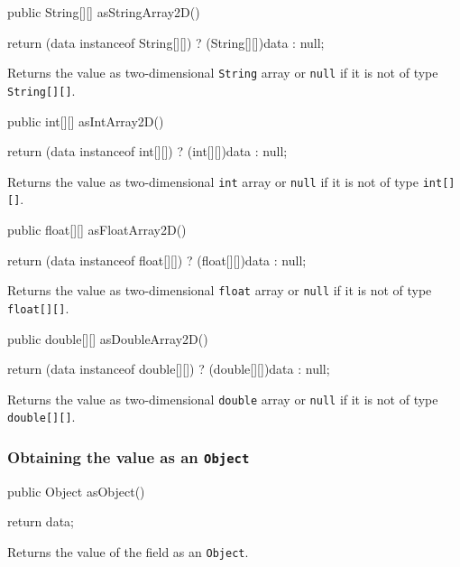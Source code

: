 \begin{code}
   
   public String[][] asStringArray2D() \begin{hide} {
      return (data instanceof String[][]) ? (String[][])data : null;
   }
   \end{hide}
\end{code}
\begin{tabb}
Returns the value as two-dimensional \texttt{String} array or \texttt{null} if it is not of type \texttt{String[][]}.
\end{tabb}
\begin{code}

   public int[][] asIntArray2D() \begin{hide} {
      return (data instanceof int[][]) ? (int[][])data : null;
   }
   \end{hide}
\end{code}
\begin{tabb}
Returns the value as two-dimensional \texttt{int} array or \texttt{null} if it is not of type \texttt{int[][]}.
\end{tabb}
\begin{code}
   
   public float[][] asFloatArray2D() \begin{hide} {
      return (data instanceof float[][]) ? (float[][])data : null;
   }
   \end{hide}
\end{code}
\begin{tabb}
Returns the value as two-dimensional \texttt{float} array or \texttt{null} if it is not of type \texttt{float[][]}.
\end{tabb}
\begin{code}

   public double[][] asDoubleArray2D() \begin{hide} {
      return (data instanceof double[][]) ? (double[][])data : null;
   }
   \end{hide}
\end{code}
\begin{tabb}
Returns the value as two-dimensional \texttt{double} array or \texttt{null} if it is not of type \texttt{double[][]}.
\end{tabb}

\subsubsection*{Obtaining the value as an \texttt{Object}}

\begin{code}
   public Object asObject() \begin{hide} {
      return data;
   }
   \end{hide}
\end{code}
\begin{tabb}
Returns the value of the field as an \texttt{Object}.
\end{tabb}
   
\begin{code}\begin{hide}
}
\end{hide}\end{code}
